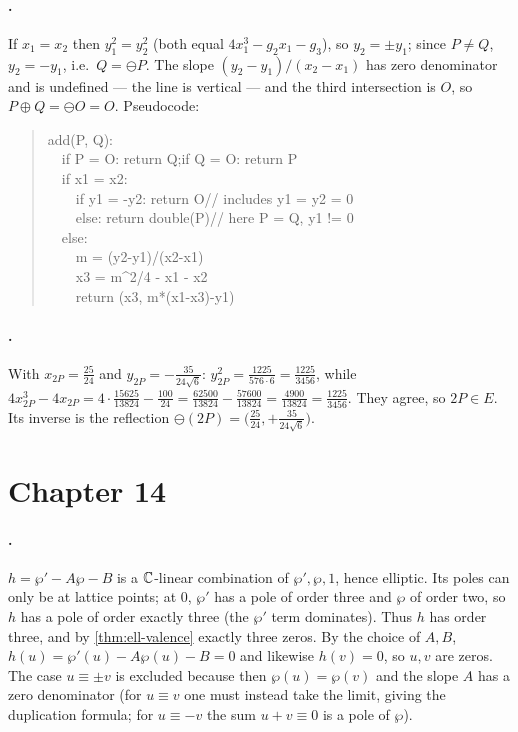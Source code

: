 \paragraph{.}
If \(x_1 = x_2\) then \(y_1^2 = y_2^2\) (both equal \(4x_1^3 - g_2 x_1 - g_3\)), so
\(y_2 = \pm y_1\); since \(P \ne Q\), \(y_2 = -y_1\), i.e.\ \(Q = \ominus P\). The
slope \((y_2-y_1)/(x_2-x_1)\) has zero denominator and is undefined --- the line is
vertical --- and the third intersection is \(O\), so \(P \oplus Q = \ominus O = O\).
Pseudocode:
\begin{quote}\ttfamily
add(P, Q):\\
\ \ if P = O: return Q;\quad if Q = O: return P\\
\ \ if x1 = x2:\\
\ \ \ \ if y1 = -y2: return O\quad // includes y1 = y2 = 0\\
\ \ \ \ else: return double(P)\quad // here P = Q, y1 != 0\\
\ \ else:\\
\ \ \ \ m = (y2-y1)/(x2-x1)\\
\ \ \ \ x3 = m\^{}2/4 - x1 - x2\\
\ \ \ \ return (x3, m*(x1-x3)-y1)
\end{quote}

\paragraph{.}
With \(x_{2P} = \tfrac{25}{24}\) and \(y_{2P} = -\tfrac{35}{24\sqrt6}\):
\(y_{2P}^2 = \tfrac{1225}{576 \cdot 6} = \tfrac{1225}{3456}\), while
\(4x_{2P}^3 - 4x_{2P} = 4\cdot\tfrac{15625}{13824} - \tfrac{100}{24}
= \tfrac{62500}{13824} - \tfrac{57600}{13824} = \tfrac{4900}{13824} = \tfrac{1225}{3456}\).
They agree, so \(2P \in E\). Its inverse is the reflection
\(\ominus(2P) = \bigl(\tfrac{25}{24}, +\tfrac{35}{24\sqrt6}\bigr)\).

\section{Chapter 14}
\label{sec:soln-ch14}

\paragraph{.}
\(h = \wp' - A\wp - B\) is a \(\mathbb{C}\)-linear combination of \(\wp', \wp, 1\), hence
elliptic. Its poles can only be at lattice points; at \(0\), \(\wp'\) has a pole
of order three and \(\wp\) of order two, so \(h\) has a pole of order exactly three
(the \(\wp'\) term dominates). Thus \(h\) has order three, and by
\cref{thm:ell-valence} exactly three zeros. By the choice of \(A, B\), \(h(u) =
\wp'(u) - A\wp(u) - B = 0\) and likewise \(h(v) = 0\), so \(u, v\) are zeros. The
case \(u \equiv \pm v\) is excluded because then \(\wp(u) = \wp(v)\) and the slope
\(A\) has a zero denominator (for \(u \equiv v\) one must instead take the limit,
giving the duplication formula; for \(u \equiv -v\) the sum \(u+v \equiv 0\) is a
pole of \(\wp\)).

